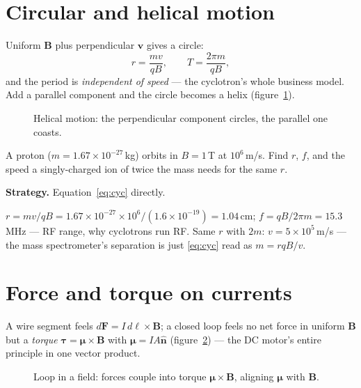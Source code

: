 \section{Circular and helical motion}\label{sec:mag-circle}

Uniform $\mathbf B$ plus perpendicular $\mathbf v$ gives a circle:
\begin{equation}
  r=\frac{mv}{qB},\qquad T=\frac{2\pi m}{qB},\label{eq:cyc}
\end{equation}
and the period is \emph{independent of speed} --- the cyclotron's whole
business model. Add a parallel component and the circle becomes a helix
(figure~\ref{fig:helix}).

\begin{figure}[htbp]\centering

\caption{Helical motion: the perpendicular component circles, the
parallel one coasts.}
\label{fig:helix}
\end{figure}

\begin{example}\label{ex:cyc}
A proton ($m=1.67\times10^{-27}$\,kg) orbits in $B=1$\,T at
$10^{6}$\,m/s. Find $r$, $f$, and the speed a singly-charged ion of
twice the mass needs for the same $r$.
\par\smallskip
\textbf{Strategy.} Equation~\eqref{eq:cyc} directly.
\begin{solution}
$r=mv/qB=1.67\times10^{-27}\times10^{6}/(1.6\times10^{-19})=1.04$\,cm;
$f=qB/2\pi m=15.3$\,MHz --- RF range, why cyclotrons run RF.
Same $r$ with $2m$: $v=5\times10^{5}$\,m/s --- the mass spectrometer's
separation is just \eqref{eq:cyc} read as $m=rqB/v$. \checkmark
\end{solution}
\end{example}

\section{Force and torque on currents}\label{sec:mag-torque}

A wire segment feels $d\mathbf F=I\,d\boldsymbol\ell\times\mathbf B$;
a closed loop feels no net force in uniform $\mathbf B$ but a
\emph{torque} $\boldsymbol\tau=\boldsymbol\mu\times\mathbf B$ with
$\boldsymbol\mu=IA\hat{\mathbf n}$ (figure~\ref{fig:loop}) ---
the DC motor's entire principle in one vector product.

\begin{figure}[htbp]\centering

\caption{Loop in a field: forces couple into torque
$\boldsymbol\mu\times\mathbf B$, aligning $\boldsymbol\mu$ with
$\mathbf B$.}
\label{fig:loop}
\end{figure}


